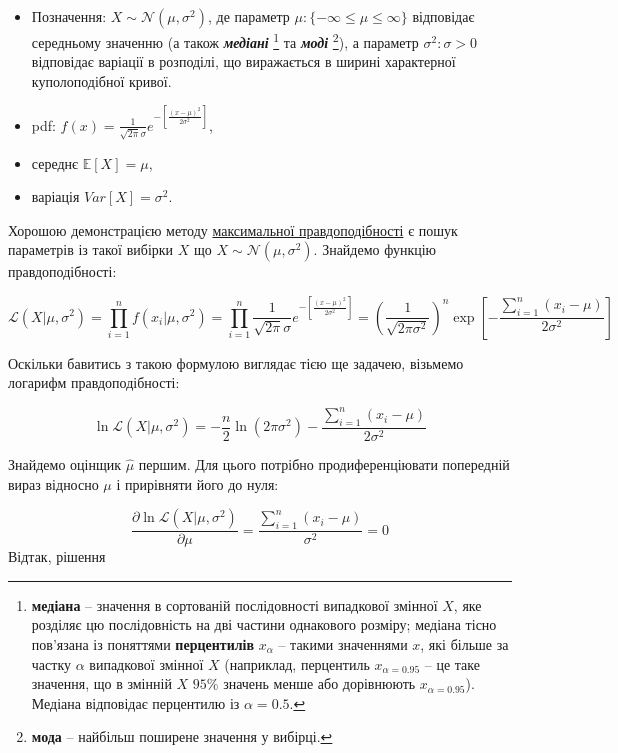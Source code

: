 \documentclass[
  11pt,
]{book}
\begin{document}
\begin{itemize}
\item
  Позначення: \(X \sim \mathcal{N}(\mu, \sigma^2)\), де параметр \(\mu: \{-\infty \leq \mu \leq \infty\}\) відповідає середньому значенню (а також \textbf{\emph{медіані}} \footnote{\textbf{медіана} -- значення в сортованій послідовності випадкової змінної \(X\), яке розділяє цю послідовність на дві частини однакового розміру; медіана тісно пов'язана із поняттями \textbf{перцентилів} \(x_{\alpha}\) -- такими значеннями \(x\), які більше за частку \(\alpha\) випадкової змінної \(X\) (наприклад, перцентиль \(x_{\alpha = 0.95}\) -- це таке значення, що в змінній \(X\) \(95 \%\) значень менше або дорівнюють \(x_{\alpha = 0.95}\)). Медіана відповідає перцентилю із \(\alpha = 0.5\).} та \textbf{\emph{моді}} \footnote{\textbf{мода} -- найбільш поширене значення у вибірці.}), а параметр \(\sigma^2: \sigma > 0\) відповідає варіації в розподілі, що виражається в ширині характерної куполоподібної кривої.
\item
  pdf: \(f(x) = \frac{1}{\sqrt{2 \pi} \sigma} e^{-\left[ \frac{(x - \mu)^2}{2 \sigma^2} \right]}\),
\item
  середнє \(\mathbb{E} [X] = \mu\),
\item
  варіація \(Var[X] = \sigma^2\).
\end{itemize}

Хорошою демонстрацією методу \hyperref[mle]{максимальної правдоподібності} є пошук параметрів із такої вибірки \(X\) що \(X \sim \mathcal{N}(\mu, \sigma^2)\). Знайдемо функцію правдоподібності:

\[\mathcal{L}(X | \mu, \sigma^2) = \prod \limits_{i=1}^n f(x_i| \mu, \sigma^2) = \prod \limits_{i=1}^n \frac{1}{\sqrt{2 \pi} \sigma} e^{-\left[ \frac{(x - \mu)^2}{2 \sigma^2} \right]} = \left( \frac{1}{\sqrt{2 \pi \sigma^2}} \right)^n \exp \left[ - \frac{\sum \limits_{i=1}^n (x_i - \mu)}{2 \sigma^2} \right]\]

Оскільки бавитись з такою формулою виглядає тією ще задачею, візьмемо логарифм правдоподібності:

\[\ln \mathcal{L}(X | \mu, \sigma^2) = - \frac{n}{2} \ln{(2 \pi \sigma^2)} - \frac{\sum \limits_{i=1}^n (x_i - \mu)}{2 \sigma^2}\]

Знайдемо оцінщик \(\hat{\mu}\) першим. Для цього потрібно продиференціювати попередній вираз відносно \(\mu\) і прирівняти його до нуля:

\[\frac{\partial \ln \mathcal{L}(X | \mu, \sigma^2)}{\partial \mu} = \frac{\sum \limits_{i=1}^n (x_i - \mu)}{\sigma^2} = 0\]
Відтак, рішення
\end{document}
